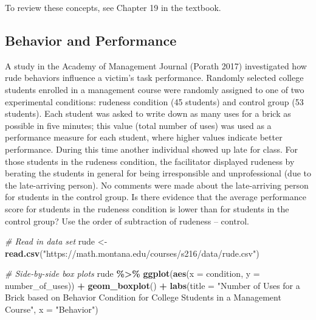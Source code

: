 \documentclass[
]{report}
\newenvironment{Shaded}{\begin{snugshade}}{\end{snugshade}}
\newcommand{\AttributeTok}[1]{\textcolor[rgb]{0.13,0.29,0.53}{#1}}
\newcommand{\CommentTok}[1]{\textcolor[rgb]{0.56,0.35,0.01}{\textit{#1}}}
\newcommand{\FunctionTok}[1]{\textcolor[rgb]{0.13,0.29,0.53}{\textbf{#1}}}
\newcommand{\NormalTok}[1]{#1}
\newcommand{\OtherTok}[1]{\textcolor[rgb]{0.56,0.35,0.01}{#1}}
\newcommand{\SpecialCharTok}[1]{\textcolor[rgb]{0.81,0.36,0.00}{\textbf{#1}}}
\newcommand{\StringTok}[1]{\textcolor[rgb]{0.31,0.60,0.02}{#1}}
\begin{document}
To review these concepts, see Chapter 19 in the textbook.

\hypertarget{behavior-and-performance}{%
\subsection{Behavior and Performance}\label{behavior-and-performance}}

A study in the Academy of Management Journal (Porath 2017) investigated how rude behaviors influence a victim's task performance. Randomly selected college students enrolled in a management course were randomly assigned to one of two experimental conditions: rudeness condition (45 students) and control group (53 students). Each student was asked to write down as many uses for a brick as possible in five minutes; this value (total number of uses) was used as a performance measure for each student, where higher values indicate better performance. During this time another individual showed up late for class. For those students in the rudeness condition, the facilitator displayed rudeness by berating the students in general for being irresponsible and unprofessional (due to the late-arriving person). No comments were made about the late-arriving person for students in the control group. Is there evidence that the average performance score for students in the rudeness condition is lower than for students in the control group? Use the order of subtraction of rudeness -- control.

\begin{Shaded}
\begin{Highlighting}[]
\CommentTok{\# Read in data set}
\NormalTok{rude }\OtherTok{\textless{}{-}} \FunctionTok{read.csv}\NormalTok{(}\StringTok{"https://math.montana.edu/courses/s216/data/rude.csv"}\NormalTok{)}
\end{Highlighting}
\end{Shaded}

\newpage

\begin{Shaded}
\begin{Highlighting}[]
\CommentTok{\# Side{-}by{-}side box plots}
\NormalTok{rude }\SpecialCharTok{\%\textgreater{}\%}
\FunctionTok{ggplot}\NormalTok{(}\FunctionTok{aes}\NormalTok{(}\AttributeTok{x =}\NormalTok{ condition, }\AttributeTok{y =}\NormalTok{ number\_of\_uses)) }\SpecialCharTok{+}
    \FunctionTok{geom\_boxplot}\NormalTok{() }\SpecialCharTok{+} 
    \FunctionTok{labs}\NormalTok{(}\AttributeTok{title =} \StringTok{"Number of Uses for a Brick based on Behavior Condition}
\StringTok{         for College Students in a Management Course"}\NormalTok{,}
         \AttributeTok{x =} \StringTok{"Behavior"}\NormalTok{) }
\end{Highlighting}
\end{Shaded}
\end{document}
